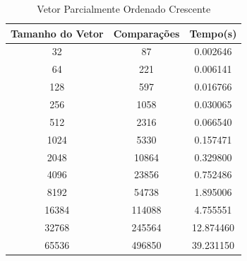 \documentclass[12pt,a4paper,twoside]{report}
\begin{document}
\begin{table}[h]
  \centering
  \caption{Vetor Parcialmente Ordenado Crescente \label{tab:poc}}
  \begin{tabular}{ccc} \\\hline
  \textbf{Tamanho do Vetor} & \textbf{Comparações} & \textbf{Tempo(s)} \\\hline
  32                        & 87                   & 0.002646          \\\hline
  64                        & 221                  & 0.006141          \\\hline
  128                       & 597                  & 0.016766          \\\hline
  256                       & 1058                 & 0.030065          \\\hline
  512                       & 2316                 & 0.066540          \\\hline
  1024                      & 5330                 & 0.157471          \\\hline
  2048                      & 10864                & 0.329800          \\\hline
  4096                      & 23856                & 0.752486         \\\hline
  8192                      & 54738                & 1.895006        \\\hline
  16384                     & 114088               & 4.755551        \\\hline
  32768                     & 245564               & 12.874460        \\\hline
  65536                     & 496850               & 39.231150        \\\hline
  \end{tabular}
\end{table}
\end{document}
